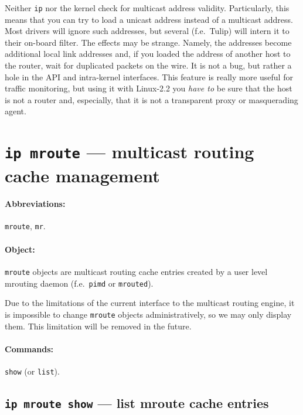 \begin{NB}
 Neither \verb|ip| nor the kernel check for multicast address validity.
 Particularly, this means that you can try to load a unicast address
 instead of a multicast address. Most drivers will ignore such addresses,
 but several (f.e.\ Tulip) will intern it to their on-board filter.
 The effects may be strange. Namely, the addresses become additional
 local link addresses and, if you loaded the address of another host
 to the router, wait for duplicated packets on the wire.
 It is not a bug, but rather a hole in the API and intra-kernel interfaces.
 This feature is really more useful for traffic monitoring, but using it
 with Linux-2.2 you {\em have to\/} be sure that the host is not
 a router and, especially, that it is not a transparent proxy or masquerading
 agent.
\end{NB}



\section{{\tt ip mroute} --- multicast routing cache management}
\label{IP-MROUTE}

\paragraph{Abbreviations:} \verb|mroute|, \verb|mr|.

\paragraph{Object:} \verb|mroute| objects are multicast routing cache
entries created by a user level mrouting daemon
(f.e.\ \verb|pimd| or \verb|mrouted|).

Due to the limitations of the current interface to the multicast routing
engine, it is impossible to change \verb|mroute| objects administratively,
so we may only display them. This limitation will be removed
in the future.

\paragraph{Commands:} \verb|show| (or \verb|list|).


\subsection{{\tt ip mroute show} --- list mroute cache entries}


